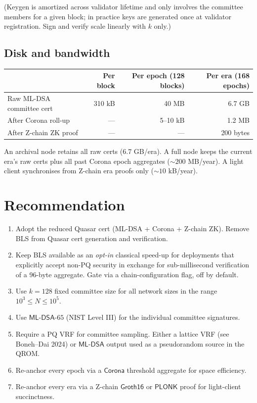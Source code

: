 \documentclass[11pt]{article}
\begin{document}
(Keygen is amortized across validator lifetime and only involves the
committee members for a given block; in practice keys are generated
once at validator registration. Sign and verify scale linearly with $k$
only.)

\subsection{Disk and bandwidth}

\begin{center}
\begin{tabular}{lrrr}
\toprule
 & Per block & Per epoch (128 blocks) & Per era (168 epochs) \\
\midrule
Raw ML-DSA committee cert & 310 kB & 40 MB & 6.7 GB \\
After Corona roll-up    & —      & 5--10 kB & 1.2 MB \\
After Z-chain ZK proof    & —      & —         & 200 bytes \\
\bottomrule
\end{tabular}
\end{center}

An archival node retains all raw certs (6.7 GB/era). A full node keeps the
current era's raw certs plus all past Corona epoch aggregates (${\sim}200$
MB/year). A light client synchronises from Z-chain era proofs only
(${\sim}10$ kB/year).

\section{Recommendation}

\begin{enumerate}
  \item Adopt the reduced Quasar cert (ML-DSA + Corona + Z-chain ZK).
        Remove BLS from Quasar cert generation and verification.
  \item Keep BLS available as an \emph{opt-in} classical speed-up for
        deployments that explicitly accept non-PQ security in exchange
        for sub-millisecond verification of a 96-byte aggregate. Gate
        via a chain-configuration flag, off by default.
  \item Use $k = 128$ fixed committee size for all network sizes in
        the range $10^3 \leq N \leq 10^5$.
  \item Use $\mathsf{ML\text{-}DSA}\text{-}65$ (NIST Level III) for the
        individual committee signatures.
  \item Require a PQ VRF for committee sampling. Either a lattice VRF
        (see Boneh--Dai 2024) or $\mathsf{ML\text{-}DSA}$ output used
        as a pseudorandom source in the QROM.
  \item Re-anchor every epoch via a $\mathsf{Corona}$ threshold
        aggregate for space efficiency.
  \item Re-anchor every era via a Z-chain $\mathsf{Groth16}$ or
        $\mathsf{PLONK}$ proof for light-client succinctness.
\end{enumerate}
\end{document}
